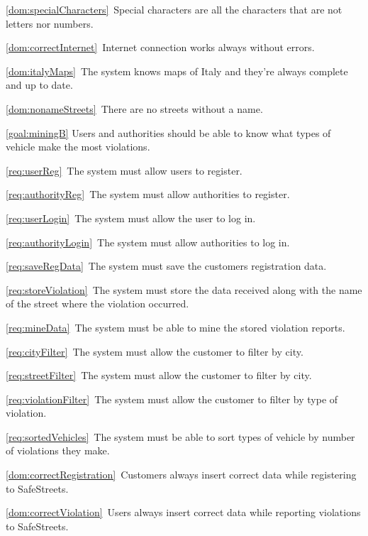 \begin{description}
\begin{description}
\begin{description}
							\item \ref{dom:specialCharacters}\ Special characters are all the characters that are not letters nor numbers.
							\item \ref{dom:correctInternet}\ Internet connection works always without errors.
							\item \ref{dom:italyMaps}\ The system knows maps of Italy and they’re always complete and up to date.
							\item \ref{dom:nonameStreets}\ There are no streets without a name.
						\end{description}
					\item \ref{goal:miningB} Users and authorities should be able to know what types of vehicle make the most violations.
						\begin{description}
							\item \ref{req:userReg}\ The system must allow users to register.
							\item \ref{req:authorityReg}\ The system must allow authorities to register.
							\item \ref{req:userLogin}\ The system must allow the user to log in.
							\item \ref{req:authorityLogin}\ The system must allow authorities to log in.
							\item \ref{req:saveRegData}\ The system must save the customers registration data.
							\item \ref{req:storeViolation}\ The system must store the data received along with the name of the street where the violation occurred.
							\item \ref{req:mineData}\ The system must be able to mine the stored violation reports.
							\item \ref{req:cityFilter}\ The system must allow the customer to filter by city.
							\item \ref{req:streetFilter}\ The system must allow the customer to filter by city.
							\item \ref{req:violationFilter}\ The system must allow the customer to filter by type of violation.
							\item \ref{req:sortedVehicles}\ The system must be able to sort types of vehicle by number of violations they make.
							\item \ref{dom:correctRegistration}\ Customers always insert correct data while registering to SafeStreets.
							\item \ref{dom:correctViolation}\ Users always insert correct data while reporting violations to SafeStreets.

\end{description}
\end{description}
\end{description}
